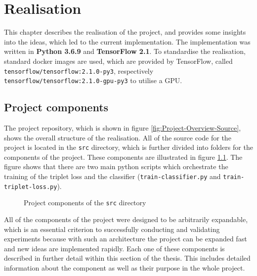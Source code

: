 \chapter{Realisation}
\label{ch:Realisation}
This chapter describes the realisation of the project, and provides some insights into the ideas, which led to the current implementation. The implementation was written in \textbf{Python 3.6.9} and \textbf{TensorFlow 2.1}. To standardise the realisation, standard docker images are used, which are provided by TensorFlow, called \texttt{tensorflow/tensorflow:2.1.0-py3}, respectively \texttt{tensorflow/tensorflow:2.1.0-gpu-py3} to utilise a GPU.

\section{Project components}
\label{sec:Project-Components}
The project repository, which is shown in figure \ref{fig:Project-Overview-Source}, shows the overall structure of the realisation. All of the source code for the project is located in the \texttt{src} directory, which is further divided into folders for the components of the project. These components are illustrated in figure \ref{sec:Project-Components}. The figure shows that there are two main python scripts which orchestrate the training of the triplet loss and the classifier (\texttt{train-classifier.py} and \texttt{train-triplet-loss.py}). 

\begin{figure}[ht]
\caption{Project components of the \texttt{src} directory}
\label{fig:Project-Components}
\end{figure}
\noindent
All of the components of the project were designed to be arbitrarily expandable, which is an essential criterion to successfully conducting and validating experiments because with such an architecture the project can be expanded fast and new ideas are implemented rapidly.
\newline
\newline
Each one of these components is described in further detail within this section of the thesis. This includes detailed information about the component as well as their purpose in the whole project.

